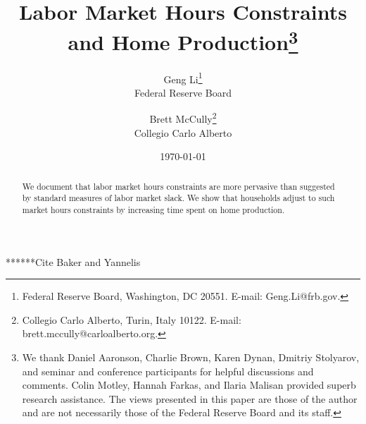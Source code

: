 \documentclass[12pt]{article}
\begin{document}
\baselineskip 20pt
\newtheorem{proposition}{Proposition}
\newtheorem{assumption}{Technical Assumption}

\begin{titlepage}
\title{{Labor Market Hours Constraints and Home Production}\thanks{We thank Daniel Aaronson, Charlie Brown, Karen Dynan, Dmitriy Stolyarov, and seminar and conference participants for helpful discussions and comments. Colin Motley, Hannah Farkas, and Ilaria Malisan provided superb research assistance. The views presented in this paper are those of the author and are not necessarily those of the Federal Reserve Board and its staff.}
\\ \vspace{0.5in}
}
  \author{Geng Li\thanks{Federal Reserve Board, Washington, DC 20551.  E-mail: Geng.Li@frb.gov. }  \\
          Federal Reserve Board
          \and Brett McCully\thanks{Collegio Carlo Alberto, Turin, Italy 10122.  E-mail: brett.mccully@carloalberto.org.} \\
          Collegio Carlo Alberto\vspace{.6in}}
\bigskip
\date{\today}
\maketitle\thispagestyle{empty}
\begin{abstract}
We document that labor market hours constraints are more pervasive than suggested by standard measures of labor market slack. We show that households adjust to such market hours constraints by increasing time spent on home production. 
\end{abstract}
\end{titlepage}
\clearpage






******Cite Baker and Yannelis

\end{document}

